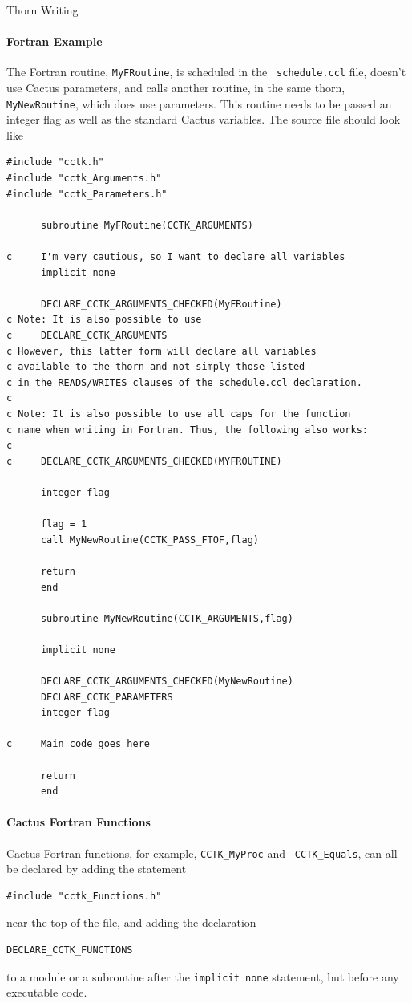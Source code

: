 \begin{cactuspart}{Thorn Writing}
\paragraph{Fortran Example}

The Fortran routine, \verb|MyFRoutine|, is scheduled in the {\tt
schedule.ccl} file, doesn't use Cactus parameters, and calls another
routine, in the same thorn, \verb|MyNewRoutine|, which does use
parameters.  This routine needs to be passed an integer flag as well
as the standard Cactus variables. The source file should look like
%
\begin{verbatim}
#include "cctk.h"
#include "cctk_Arguments.h"
#include "cctk_Parameters.h"

      subroutine MyFRoutine(CCTK_ARGUMENTS)

c     I'm very cautious, so I want to declare all variables
      implicit none

      DECLARE_CCTK_ARGUMENTS_CHECKED(MyFRoutine)
c Note: It is also possible to use
c     DECLARE_CCTK_ARGUMENTS
c However, this latter form will declare all variables
c available to the thorn and not simply those listed
c in the READS/WRITES clauses of the schedule.ccl declaration.
c
c Note: It is also possible to use all caps for the function
c name when writing in Fortran. Thus, the following also works:
c
c     DECLARE_CCTK_ARGUMENTS_CHECKED(MYFROUTINE)

      integer flag

      flag = 1
      call MyNewRoutine(CCTK_PASS_FTOF,flag)

      return
      end

      subroutine MyNewRoutine(CCTK_ARGUMENTS,flag)

      implicit none

      DECLARE_CCTK_ARGUMENTS_CHECKED(MyNewRoutine)
      DECLARE_CCTK_PARAMETERS
      integer flag

c     Main code goes here

      return
      end

\end{verbatim}

\paragraph{Cactus Fortran Functions}

Cactus Fortran functions, for example, \texttt{CCTK\_MyProc} and {\tt
CCTK\_Equals}, can all be declared by adding the statement
%
\begin{verbatim}
#include "cctk_Functions.h"
\end{verbatim}
%
near the top of the file, and adding the declaration
%
\begin{verbatim}
DECLARE_CCTK_FUNCTIONS
\end{verbatim}
%
to a module or a subroutine after the \texttt{implicit none}
statement, but before any executable code.


\end{cactuspart}
